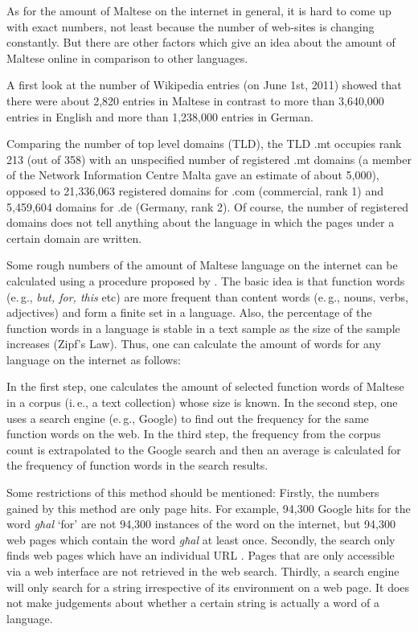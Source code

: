 \documentclass[]{../../metanetpaper}
\begin{document}
\begin{multicols}{2}
As for the amount of Maltese on the internet in general, it is hard to come up with exact numbers, not least because the number of web-sites is changing constantly. But there are other factors which give an idea about the amount of Maltese online in comparison to other languages.

A first look at the number of Wikipedia entries (on June 1st, 2011) showed that there were about 2,820 entries in Maltese in contrast to more than 3,640,000 entries in English and more than 1,238,000 entries in German.

Comparing the number of top level domains (TLD), the TLD .mt occupies rank 213 (out of 358) with an unspecified number of registered .mt domains (a member of the Network Information Centre Malta gave an estimate of about 5,000), opposed to 21,336,063 registered domains for .com (commercial, rank 1) and 5,459,604 domains for .de (Germany, rank 2). Of course, the number of registered domains does not tell anything about the language in which the pages under a certain domain are written.

Some rough numbers of the amount of Maltese language on the internet can be calculated using a procedure proposed by \cite{Kilgarriff-Grefenstette:2003}\cite{Gatt1en}. The basic idea is that function words (e.\,g., \emph{but, for, this} etc) are more frequent than content words (e.\,g., nouns, verbs, adjectives) and form a finite set in a language. Also, the percentage of the function words in a language is stable in a text sample as the size of the sample increases (Zipf's Law). Thus, one can calculate the amount of words for any language on the internet as follows: 

In the first step, one calculates the amount of selected function words of Maltese in a corpus (i.\,e., a text collection) whose size is known. In the second step, one uses a search engine (e.\,g., Google) to find out the frequency for the same function words on the web. In the third step, the frequency from the corpus count is extrapolated to the Google search and then an average is calculated for the frequency of function words in the search results.

Some restrictions of this method should be mentioned: Firstly, the numbers gained by this method are only page hits. For example, 94,300 Google hits for the word \emph{għal} `for’ are not 94,300 instances of the word on the internet, but 94,300 web pages which contain the word \emph{għal} at least once. Secondly, the search only finds web pages which have an individual URL \cite{Kilgarriff-Grefenstette:2003}. Pages that are only accessible via a web interface are not retrieved in the web search. Thirdly, a search engine will only search for a string irrespective of its environment on a web page. It does not make judgements about whether a certain string is actually a word of a language. 


\end{multicols}
\end{document}
